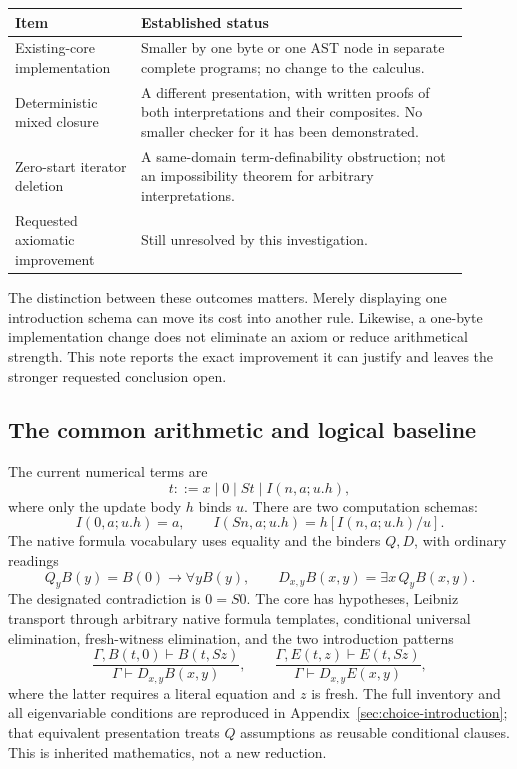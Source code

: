 \documentclass[11pt,letterpaper]{article}
\theoremstyle{definition}
\theoremstyle{remark}
\begin{document}
\begin{center}
\begin{tabular}{p{0.25\linewidth}p{0.65\linewidth}}
\toprule
Item & Established status\\
\midrule
Existing-core implementation & Smaller by one byte or one AST node in
separate complete programs; no change to the calculus.\\
Deterministic mixed closure & A different presentation, with written
proofs of both interpretations and their composites. No smaller checker
for it has been demonstrated.\\
Zero-start iterator deletion & A same-domain term-definability obstruction;
not an impossibility theorem for arbitrary interpretations.\\
Requested axiomatic improvement & Still unresolved by this investigation.\\
\bottomrule
\end{tabular}
\end{center}

The distinction between these outcomes matters. Merely displaying one
introduction schema can move its cost into another rule. Likewise, a
one-byte implementation change does not eliminate an axiom or reduce
arithmetical strength. This note reports the exact improvement it can
justify and leaves the stronger requested conclusion open.

\subsection{The common arithmetic and logical baseline}

The current numerical terms are
\[
 t ::= x\mid0\mid St\mid I(n,a;u.h),
\]
where only the update body $h$ binds $u$. There are two computation schemas:
\[
 I(0,a;u.h)=a,
 \qquad I(Sn,a;u.h)=h[I(n,a;u.h)/u].
\]
The native formula vocabulary uses equality and the binders $Q,D$, with
ordinary readings
\[
 Q_yB(y)=B(0)\to\forall yB(y),\qquad
 D_{x,y}B(x,y)=\exists x\,Q_yB(x,y).
\]
The designated contradiction is $0=S0$. The core has hypotheses,
Leibniz transport through arbitrary native formula templates, conditional
universal elimination, fresh-witness elimination, and the two introduction
patterns
\[
 \frac{\Gamma,B(t,0)\vdash B(t,Sz)}{\Gamma\vdash D_{x,y}B(x,y)},
 \qquad
 \frac{\Gamma,E(t,z)\vdash E(t,Sz)}{\Gamma\vdash D_{x,y}E(x,y)},
\]
where the latter requires a literal equation and $z$ is fresh. The full
inventory and all eigenvariable conditions are reproduced in
Appendix~\ref{sec:choice-introduction}; that equivalent presentation treats
$Q$ assumptions as reusable conditional clauses. This is inherited
mathematics, not a new reduction.
\end{document}
